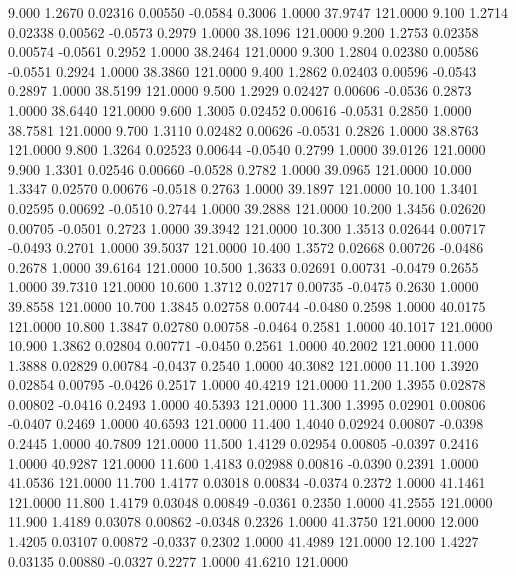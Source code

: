    9.000   1.2670   0.02316   0.00550  -0.0584   0.3006   1.0000  37.9747 121.0000
   9.100   1.2714   0.02338   0.00562  -0.0573   0.2979   1.0000  38.1096 121.0000
   9.200   1.2753   0.02358   0.00574  -0.0561   0.2952   1.0000  38.2464 121.0000
   9.300   1.2804   0.02380   0.00586  -0.0551   0.2924   1.0000  38.3860 121.0000
   9.400   1.2862   0.02403   0.00596  -0.0543   0.2897   1.0000  38.5199 121.0000
   9.500   1.2929   0.02427   0.00606  -0.0536   0.2873   1.0000  38.6440 121.0000
   9.600   1.3005   0.02452   0.00616  -0.0531   0.2850   1.0000  38.7581 121.0000
   9.700   1.3110   0.02482   0.00626  -0.0531   0.2826   1.0000  38.8763 121.0000
   9.800   1.3264   0.02523   0.00644  -0.0540   0.2799   1.0000  39.0126 121.0000
   9.900   1.3301   0.02546   0.00660  -0.0528   0.2782   1.0000  39.0965 121.0000
  10.000   1.3347   0.02570   0.00676  -0.0518   0.2763   1.0000  39.1897 121.0000
  10.100   1.3401   0.02595   0.00692  -0.0510   0.2744   1.0000  39.2888 121.0000
  10.200   1.3456   0.02620   0.00705  -0.0501   0.2723   1.0000  39.3942 121.0000
  10.300   1.3513   0.02644   0.00717  -0.0493   0.2701   1.0000  39.5037 121.0000
  10.400   1.3572   0.02668   0.00726  -0.0486   0.2678   1.0000  39.6164 121.0000
  10.500   1.3633   0.02691   0.00731  -0.0479   0.2655   1.0000  39.7310 121.0000
  10.600   1.3712   0.02717   0.00735  -0.0475   0.2630   1.0000  39.8558 121.0000
  10.700   1.3845   0.02758   0.00744  -0.0480   0.2598   1.0000  40.0175 121.0000
  10.800   1.3847   0.02780   0.00758  -0.0464   0.2581   1.0000  40.1017 121.0000
  10.900   1.3862   0.02804   0.00771  -0.0450   0.2561   1.0000  40.2002 121.0000
  11.000   1.3888   0.02829   0.00784  -0.0437   0.2540   1.0000  40.3082 121.0000
  11.100   1.3920   0.02854   0.00795  -0.0426   0.2517   1.0000  40.4219 121.0000
  11.200   1.3955   0.02878   0.00802  -0.0416   0.2493   1.0000  40.5393 121.0000
  11.300   1.3995   0.02901   0.00806  -0.0407   0.2469   1.0000  40.6593 121.0000
  11.400   1.4040   0.02924   0.00807  -0.0398   0.2445   1.0000  40.7809 121.0000
  11.500   1.4129   0.02954   0.00805  -0.0397   0.2416   1.0000  40.9287 121.0000
  11.600   1.4183   0.02988   0.00816  -0.0390   0.2391   1.0000  41.0536 121.0000
  11.700   1.4177   0.03018   0.00834  -0.0374   0.2372   1.0000  41.1461 121.0000
  11.800   1.4179   0.03048   0.00849  -0.0361   0.2350   1.0000  41.2555 121.0000
  11.900   1.4189   0.03078   0.00862  -0.0348   0.2326   1.0000  41.3750 121.0000
  12.000   1.4205   0.03107   0.00872  -0.0337   0.2302   1.0000  41.4989 121.0000
  12.100   1.4227   0.03135   0.00880  -0.0327   0.2277   1.0000  41.6210 121.0000
